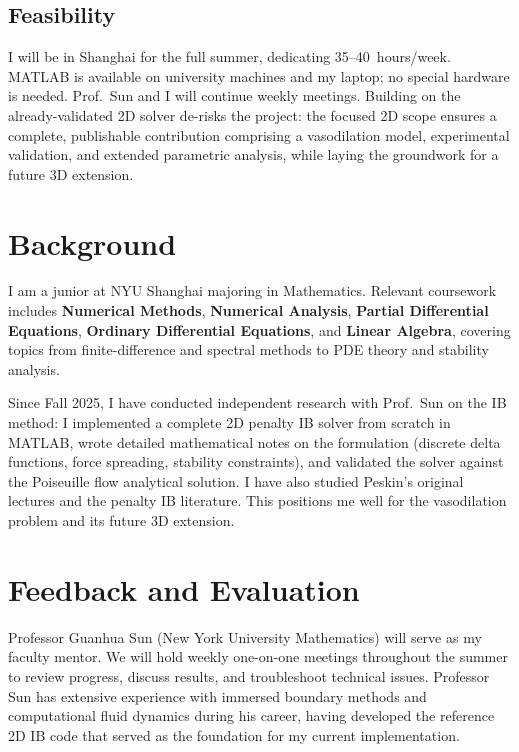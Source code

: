 \documentclass[12pt]{article}
\begin{document}
\subsection*{Feasibility}

I will be in Shanghai for the full summer, dedicating 35--40~hours/week. MATLAB is available on university machines and my laptop; no special hardware is needed. Prof.\ Sun and I will continue weekly meetings. Building on the already-validated 2D solver de-risks the project: the focused 2D scope ensures a complete, publishable contribution comprising a vasodilation model, experimental validation, and extended parametric analysis, while laying the groundwork for a future 3D extension.

\section*{Background}

I am a junior at NYU Shanghai majoring in Mathematics. Relevant coursework includes \textbf{Numerical Methods}, \textbf{Numerical Analysis}, \textbf{Partial Differential Equations}, \textbf{Ordinary Differential Equations}, and \textbf{Linear Algebra}, covering topics from finite-difference and spectral methods to PDE theory and stability analysis.

Since Fall 2025, I have conducted independent research with Prof.\ Sun on the IB method: I implemented a complete 2D penalty IB solver from scratch in MATLAB, wrote detailed mathematical notes on the formulation (discrete delta functions, force spreading, stability constraints), and validated the solver against the Poiseuille flow analytical solution. I have also studied Peskin's original lectures and the penalty IB literature. This positions me well for the vasodilation problem and its future 3D extension.

\section*{Feedback and Evaluation}

Professor Guanhua Sun (New York University Mathematics) will serve as my faculty mentor. We will hold weekly one-on-one meetings throughout the summer to review progress, discuss results, and troubleshoot technical issues. Professor Sun has extensive experience with immersed boundary methods and computational fluid dynamics during his career, having developed the reference 2D IB code that served as the foundation for my current implementation. 
\end{document}
